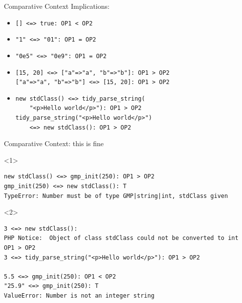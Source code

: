 \documentclass[aspectratio=169]{beamer}
\begin{document}
\begin{frame}[fragile]{Comparative Context}
    Implications:
    \begin{itemize}
        \item \texttt{[] <=> true: OP1 < OP2} 
        \item \texttt{"1" <=> "01": OP1 = OP2} 
        \item \texttt{"0e5" <=> "0e9": OP1 = OP2}
        \item \texttt{[15, 20] <=> ["a"=>"a", "b"=>"b"]: OP1 > OP2} \\
             \texttt{["a"=>"a", "b"=>"b"] <=> [15, 20]: OP1 > OP2}
        \item \begin{verbatim}
new stdClass() <=> tidy_parse_string(
    "<p>Hello world</p>"): OP1 > OP2
tidy_parse_string("<p>Hello world</p>")
    <=> new stdClass(): OP1 > OP2
    \end{verbatim}
    \end{itemize}
\end{frame}
\begin{frame}[fragile]{Comparative Context: this is fine}
    \begin{onlyenv}<1>
        \begin{verbatim}
new stdClass() <=> gmp_init(250): OP1 > OP2
gmp_init(250) <=> new stdClass(): T
TypeError: Number must be of type GMP|string|int, stdClass given
        \end{verbatim}
    \end{onlyenv}
    \begin{onlyenv}<2>
        \begin{verbatim}
3 <=> new stdClass():
PHP Notice:  Object of class stdClass could not be converted to int
OP1 > OP2
3 <=> tidy_parse_string("<p>Hello world</p>"): OP1 > OP2

5.5 <=> gmp_init(250): OP1 < OP2
"25.9" <=> gmp_init(250): T
ValueError: Number is not an integer string
        \end{verbatim}
    \end{onlyenv}
\end{frame}
\end{document}
